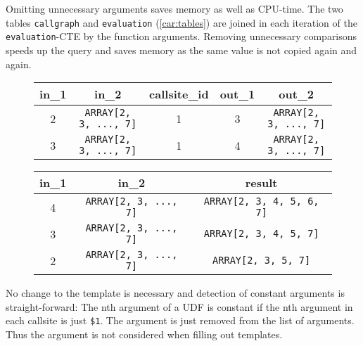 Omitting unnecessary arguments saves memory as well as CPU-time. The two tables \texttt{callgraph} and \texttt{evaluation} (\autoref{car:tables}) are joined in each iteration of the \texttt{evaluation}-CTE by the function arguments. Removing unnecessary comparisons speeds up the query and saves memory as the same value is not copied again and again.


\begin{figure}[h!]
    \centering\footnotesize
    \begin{minipage}[b]{\linewidth}
    \centering
    \begin{tabular}{c|c|c|c|c}
         in\_1 & in\_2                                     & callsite\_id & out\_1 & out\_2                                  \\\hline
         2     & \texttt{ARRAY[2, 3, ..., 7]} & 1            & 3      & \texttt{ARRAY[2, 3, ..., 7]}\\
         3     & \texttt{ARRAY[2, 3, ..., 7]} & 1            & 4      & \texttt{ARRAY[2, 3, ..., 7]}\\
    \end{tabular}
    \label{}
    \end{minipage}\par
    \vspace*{15mm}
    \begin{minipage}[b]{\linewidth}
    \centering
    \begin{tabular}{c|c|c}
         in\_1 & in\_2                                     & result                                  \\\hline
         4     & \texttt{ARRAY[2, 3, ..., 7]} & \texttt{ARRAY[2, 3, 4, 5, 6, 7]}\\
         3     & \texttt{ARRAY[2, 3, ..., 7]} & \texttt{ARRAY[2, 3, 4, 5, 7]}\\
         2     & \texttt{ARRAY[2, 3, ..., 7]} & \texttt{ARRAY[2, 3, 5, 7]}\\
    \end{tabular}
    \label{}
    \end{minipage}
    \caption{}
    \label{car:tables}
\end{figure}

No change to the template is necessary and detection of constant arguments is straight-forward: The nth argument of a UDF is constant if the nth argument in each callsite is just \texttt{\$1}. The argument is just removed from the list of arguments. Thus the argument is not considered when filling out templates.

